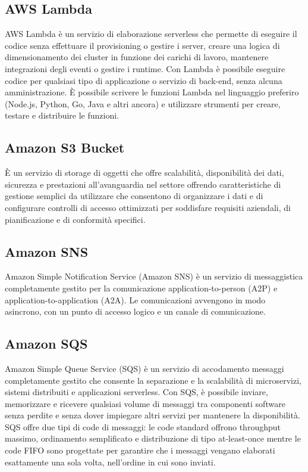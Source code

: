 \subsection{AWS Lambda}
AWS Lambda è un servizio di elaborazione serverless che permette di eseguire il codice senza effettuare il provisioning o gestire i server, creare una logica di dimensionamento dei cluster in funzione dei carichi di lavoro, mantenere integrazioni degli eventi o gestire i runtime. Con Lambda è possibile eseguire codice per qualsiasi tipo di applicazione o servizio di back-end, senza alcuna amministrazione.  È possibile scrivere le funzioni Lambda nel linguaggio preferiro (Node.js, Python, Go, Java e altri ancora) e utilizzare strumenti per creare, testare e distribuire le funzioni.
\subsection{Amazon S3 Bucket}
È un servizio di storage di oggetti che offre scalabilità, disponibilità dei dati, sicurezza e prestazioni all'avanguardia nel settore offrendo caratteristiche di gestione semplici da utilizzare che consentono di organizzare i dati e di configurare controlli di accesso ottimizzati per soddisfare requisiti aziendali, di pianificazione e di conformità specifici.
\subsection{Amazon SNS}
Amazon Simple Notification Service (Amazon SNS) è un servizio di messaggistica completamente gestito per la comunicazione application-to-person (A2P) e application-to-application (A2A).
Le comunicazioni avvengono in modo asincrono, con un punto di accesso logico e un canale di comunicazione. 
\subsection{Amazon SQS}
Amazon Simple Queue Service (SQS) è un servizio di accodamento messaggi completamente gestito che consente la separazione e la scalabilità di microservizi, sistemi distribuiti e applicazioni serverless. Con SQS, è possibile inviare, memorizzare e ricevere qualsiasi volume di messaggi tra componenti software senza perdite e senza dover impiegare altri servizi per mantenere la disponibilità. 
SQS offre due tipi di code di messaggi: le code standard offrono throughput massimo, ordinamento semplificato e distribuzione di tipo at-least-once mentre le code FIFO sono progettate per garantire che i messaggi vengano elaborati esattamente una sola volta, nell'ordine in cui sono inviati.

